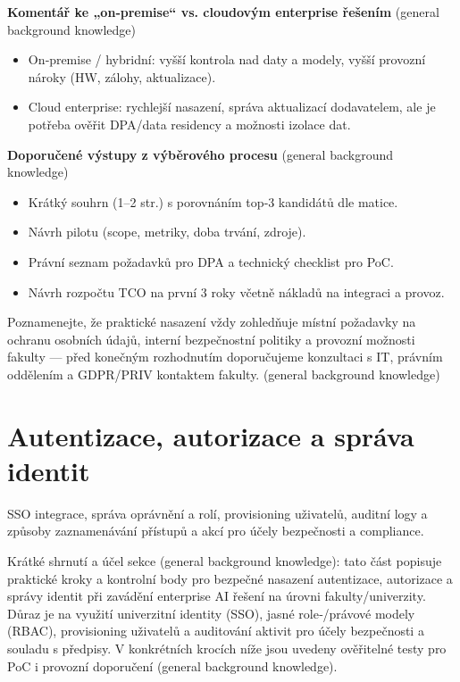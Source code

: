 \documentclass{report}%
\begin{document}
\bigskip

\textbf{Komentář ke „on‑premise“ vs. cloudovým enterprise řešením} (general background knowledge)
\begin{itemize}
  \item On‑premise / hybridní: vyšší kontrola nad daty a modely, vyšší provozní nároky (HW, zálohy, aktualizace).
  \item Cloud enterprise: rychlejší nasazení, správa aktualizací dodavatelem, ale je potřeba ověřit DPA/data residency a možnosti izolace dat.
\end{itemize}

\bigskip

\textbf{Doporučené výstupy z výběrového procesu} (general background knowledge)
\begin{itemize}
  \item Krátký souhrn (1–2 str.) s porovnáním top‑3 kandidátů dle matice.
  \item Návrh pilotu (scope, metriky, doba trvání, zdroje).
  \item Právní seznam požadavků pro DPA a technický checklist pro PoC.
  \item Návrh rozpočtu TCO na první 3 roky včetně nákladů na integraci a provoz.
\end{itemize}

\bigskip

Poznamenejte, že praktické nasazení vždy zohledňuje místní požadavky na ochranu osobních údajů, interní bezpečnostní politiky a provozní možnosti fakulty — před konečným rozhodnutím doporučujeme konzultaci s IT, právním oddělením a GDPR/PRIV kontaktem fakulty. (general background knowledge)%

%
\section{Autentizace, autorizace a správa identit}%
SSO integrace, správa oprávnění a rolí, provisioning uživatelů, auditní logy a způsoby zaznamenávání přístupů a akcí pro účely bezpečnosti a compliance.%


%
Krátké shrnutí a účel sekce (general background knowledge): tato část popisuje praktické kroky a kontrolní body pro bezpečné nasazení autentizace, autorizace a správy identit při zavádění enterprise AI řešení na úrovni fakulty/univerzity. Důraz je na využití univerzitní identity (SSO), jasné role‑/právové modely (RBAC), provisioning uživatelů a auditování aktivit pro účely bezpečnosti a souladu s předpisy. V konkrétních krocích níže jsou uvedeny ověřitelné testy pro PoC i provozní doporučení (general background knowledge).
\end{document}

